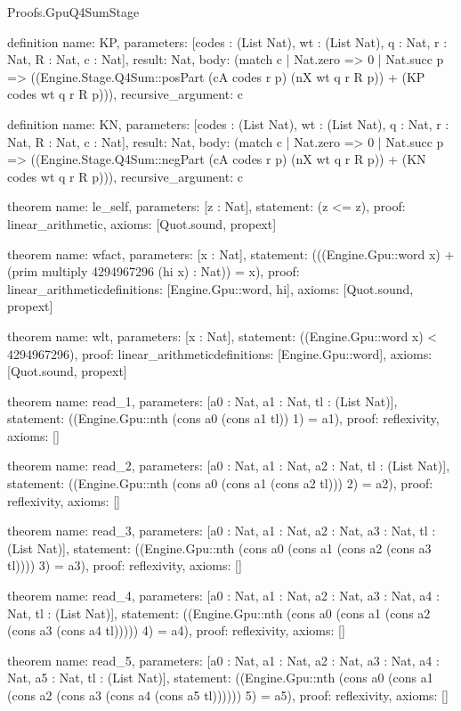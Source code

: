 \begin{lexlean}{Proofs.GpuQ4SumStage}
\begin{semanticmodule}
definition{
  name: KP,
  parameters: [codes : (List Nat), wt : (List Nat), q : Nat, r : Nat, R : Nat, c : Nat],
  result: Nat,
  body: (match c
    | Nat.zero => 0
    | Nat.succ p => ((Engine.Stage.Q4Sum::posPart (cA codes r p) (nX wt q r R p)) + (KP codes wt q r R p))),
  recursive_argument: c
}

definition{
  name: KN,
  parameters: [codes : (List Nat), wt : (List Nat), q : Nat, r : Nat, R : Nat, c : Nat],
  result: Nat,
  body: (match c
    | Nat.zero => 0
    | Nat.succ p => ((Engine.Stage.Q4Sum::negPart (cA codes r p) (nX wt q r R p)) + (KN codes wt q r R p))),
  recursive_argument: c
}

theorem{
  name: le_self,
  parameters: [z : Nat],
  statement: (z <= z),
  proof: linear_arithmetic{},
  axioms: [Quot.sound, propext]
}

theorem{
  name: wfact,
  parameters: [x : Nat],
  statement: (((Engine.Gpu::word x) + (prim multiply 4294967296 (hi x) : Nat)) = x),
  proof: linear_arithmetic{definitions: [Engine.Gpu::word, hi]},
  axioms: [Quot.sound, propext]
}

theorem{
  name: wlt,
  parameters: [x : Nat],
  statement: ((Engine.Gpu::word x) < 4294967296),
  proof: linear_arithmetic{definitions: [Engine.Gpu::word]},
  axioms: [Quot.sound, propext]
}

theorem{
  name: read_1,
  parameters: [a0 : Nat, a1 : Nat, tl : (List Nat)],
  statement: ((Engine.Gpu::nth (cons a0 (cons a1 tl)) 1) = a1),
  proof: reflexivity{},
  axioms: []
}

theorem{
  name: read_2,
  parameters: [a0 : Nat, a1 : Nat, a2 : Nat, tl : (List Nat)],
  statement: ((Engine.Gpu::nth (cons a0 (cons a1 (cons a2 tl))) 2) = a2),
  proof: reflexivity{},
  axioms: []
}

theorem{
  name: read_3,
  parameters: [a0 : Nat, a1 : Nat, a2 : Nat, a3 : Nat, tl : (List Nat)],
  statement: ((Engine.Gpu::nth (cons a0 (cons a1 (cons a2 (cons a3 tl)))) 3) = a3),
  proof: reflexivity{},
  axioms: []
}

theorem{
  name: read_4,
  parameters: [a0 : Nat, a1 : Nat, a2 : Nat, a3 : Nat, a4 : Nat, tl : (List Nat)],
  statement: ((Engine.Gpu::nth (cons a0 (cons a1 (cons a2 (cons a3 (cons a4 tl))))) 4) = a4),
  proof: reflexivity{},
  axioms: []
}

theorem{
  name: read_5,
  parameters: [a0 : Nat, a1 : Nat, a2 : Nat, a3 : Nat, a4 : Nat, a5 : Nat, tl : (List Nat)],
  statement: ((Engine.Gpu::nth (cons a0 (cons a1 (cons a2 (cons a3 (cons a4 (cons a5 tl)))))) 5) = a5),
  proof: reflexivity{},
  axioms: []
}


\end{semanticmodule}
\end{lexlean}
